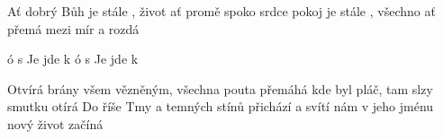 \begin{TEXT}{Ať dobrý Bůh}
\SLOKA	{}   je stále , život  ať promě \NL
	spoko srdce  pokoj   \NL
	   je stále , všechno   ať přemá \NL
	mezi  mír a  rozdá  

\REFREN 	{} ó s   Je jde k    \NL
{} ó s   Je jde k  

\SLOKA	Otvírá brány všem vězněným, všechna pouta přemáhá\NL
	kde byl pláč, tam slzy smutku otírá\NL
	Do říše Tmy a temných stínů přichází a svítí nám\NL
	v jeho jménu nový život začíná
\end{TEXT}

